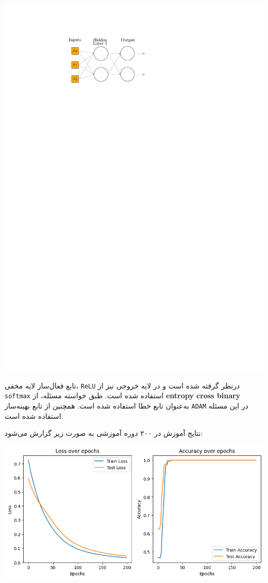 \begin{qsolve}
	\begin{center}
		\includegraphics*[width=0.5\linewidth]{pics/img2.pdf}
		\label{ساختار شبکه طراحی شده در سوال ۱}
	\end{center}
	
	تابع فعال‌ساز لایه مخفی، \texttt{ReLU} درنظر گرفته شده است و در لایه خروجی نیز از \texttt{softmax} استفاده شده است. طبق خواسته مسئله، از \textbf{entropy cross binary} به‌عنوان تابع خطا استفاده شده است. همچنین از تابع بهینه‌ساز \texttt{ADAM} در این مسئله استفاده شده است.
	
	نتایج آموزش در ۲۰۰ دوره آموزشی به صورت زیر گزارش می‌شود:
	
	\begin{center}
		\includegraphics*[width=1\linewidth]{pics/img3.png}
		\label{منحنی خطا و دقت برای داده‌های آموزش و تست}
	\end{center}
\end{qsolve}




